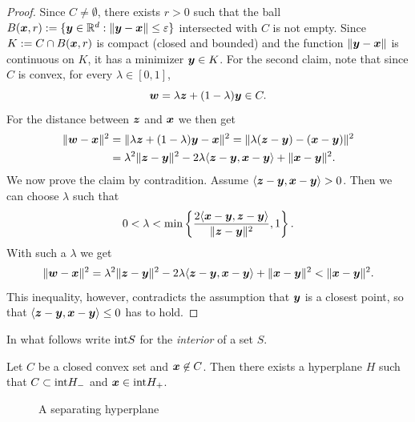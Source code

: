 \begin{proof}
 Since $C\neq \emptyset$, there exists $r>0$ such that the ball $B(\bm{x},r):=\{\bm{y}\in \mathbb{R}^d \mathrel{\mathop{:}} \Vert {\bm{y}-\bm{x}}\Vert\leq \varepsilon\}$ intersected with $C$ is not empty. Since $K:=C\cap B(\bm{x},r)$ is compact (closed and bounded) and the function $\Vert {\bm{y}-\bm{x}}\Vert$ is continuous on $K$, it has a minimizer $\bm{y}\in K$. For the second claim, note that since $C$ is convex, for every $\lambda\in [0,1]$,
 \begin{equation*}
  \bm{w} = \lambda \bm{z}+(1-\lambda)\bm{y} \in C.
 \end{equation*}
For the distance between $\bm{z}$ and $\bm{x}$ we then get
\begin{align*}
 \Vert {\bm{w}-\bm{x}}\Vert^2  &= \Vert {\lambda\bm{z}+(1-\lambda) \bm{y}-\bm{x}}\Vert^2 = \Vert {\lambda (\bm{z}-\bm{y})-(\bm{x}-\bm{y})}\Vert^2\\
 &= \lambda^2\Vert {\bm{z}-\bm{y}}\Vert^2-2\lambda \langle {\bm{z}-\bm{y}}, {\bm{x}-\bm{y}} \rangle+\Vert {\bm{x}-\bm{y}}\Vert^2.
\end{align*}
We now prove the claim by contradition. Assume $\langle {\bm{z}-\bm{y}}, {\bm{x}-\bm{y}} \rangle>0$. Then we can choose $\lambda$ such that
\begin{equation*}
 0< \lambda < \min\left\{ \frac{2\langle {\bm{x}-\bm{y}}, {\bm{z}-\bm{y}} \rangle}{\Vert {\bm{z}-\bm{y}}\Vert^2} , 1\right\}.
\end{equation*}
With such a $\lambda$ we get
\begin{equation*}
 \Vert {\bm{w}-\bm{x}}\Vert^2 = \lambda^2\Vert {\bm{z}-\bm{y}}\Vert^2-2\lambda \langle {\bm{z}-\bm{y}}, {\bm{x}-\bm{y}} \rangle+\Vert {\bm{x}-\bm{y}}\Vert^2 < \Vert {\bm{x}-\bm{y}}\Vert^2.
\end{equation*}
This inequality, however, contradicts the assumption that $\bm{y}$ is a closest point, so that
$\langle {\bm{z}-\bm{y}}, {\bm{x}-\bm{y}} \rangle\leq 0$ has to hold.
\end{proof}

In what follows write ${\operatorname{int}} S$ for the {\em interior} of a set $S$.

\begin{theorem}
 Let $C$ be a closed convex set and $\bm{x}\not\in C$. Then there exists a hyperplane $H$ such that $C\subset {\operatorname{int}} H_-$ and $\bm{x}\in {\operatorname{int}} H_+$. 
\end{theorem}

\begin{figure}[h!]
\centering
{}
\caption{A separating hyperplane}
\end{figure}

